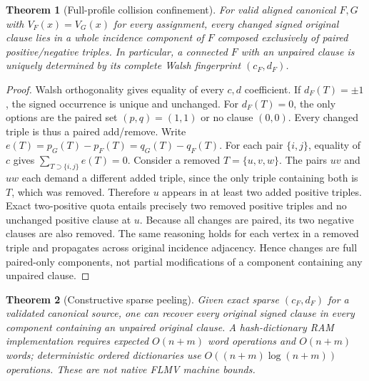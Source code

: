 \documentclass[11pt]{article}
\newtheorem{theorem}{Theorem}
\begin{document}
\begin{theorem}[Full-profile collision confinement]
For valid aligned canonical $F,G$ with $V_F(x)=V_G(x)$ for \emph{every} assignment, every changed signed original clause lies in a whole incidence component of $F$ composed exclusively of paired positive/negative triples. In particular, a connected $F$ with an unpaired clause is uniquely determined by its complete Walsh fingerprint $(c_F,d_F)$.
\end{theorem}
\begin{proof}
Walsh orthogonality gives equality of every $c,d$ coefficient. If $d_F(T)=\pm1$, the signed occurrence is unique and unchanged. For $d_F(T)=0$, the only options are the paired set $(p,q)=(1,1)$ or no clause $(0,0)$. Every changed triple is thus a paired add/remove. Write $e(T)=p_G(T)-p_F(T)=q_G(T)-q_F(T)$. For each pair $\{i,j\}$, equality of $c$ gives $\sum_{T\supset\{i,j\}}e(T)=0$. Consider a removed $T=\{u,v,w\}$. The pairs $uv$ and $uw$ each demand a different added triple, since the only triple containing both is $T$, which was removed. Therefore $u$ appears in at least two added positive triples. Exact two-positive quota entails precisely two removed positive triples and no unchanged positive clause at $u$. Because all changes are paired, its two negative clauses are also removed. The same reasoning holds for each vertex in a removed triple and propagates across original incidence adjacency. Hence changes are full paired-only components, not partial modifications of a component containing any unpaired clause.
\end{proof}
\begin{theorem}[Constructive sparse peeling]
Given exact sparse $(c_F,d_F)$ for a \emph{validated} canonical source, one can recover every original signed clause in every component containing an unpaired original clause. A hash-dictionary RAM implementation requires expected $O(n+m)$ word operations and $O(n+m)$ words; deterministic ordered dictionaries use $O((n+m)\log(n+m))$ operations. These are not native FLMV machine bounds.
\end{theorem}
\end{document}
